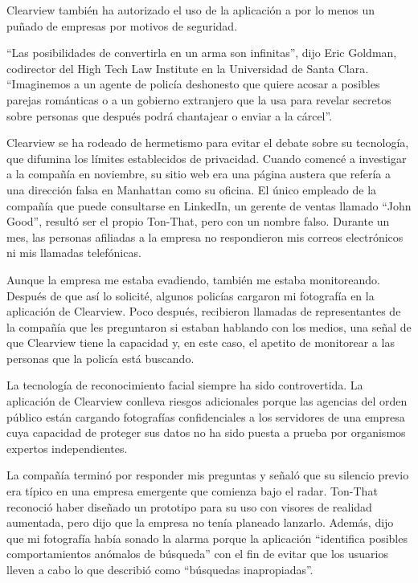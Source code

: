 Clearview también ha autorizado el uso de la aplicación a por lo menos
un puñado de empresas por motivos de seguridad.

``Las posibilidades de convertirla en un arma son infinitas'', dijo Eric
Goldman, codirector del High Tech Law Institute en la Universidad de
Santa Clara. ``Imaginemos a un agente de policía deshonesto que quiere
acosar a posibles parejas románticas o a un gobierno extranjero que la
usa para revelar secretos sobre personas que después podrá chantajear o
enviar a la cárcel''.

Clearview se ha rodeado de hermetismo para evitar el debate sobre su
tecnología, que difumina los límites establecidos de privacidad. Cuando
comencé a investigar a la compañía en noviembre, su sitio web era una
página austera que refería a una dirección falsa en Manhattan como su
oficina. El único empleado de la compañía que puede consultarse en
LinkedIn, un gerente de ventas llamado ``John Good'', resultó ser el
propio Ton-That, pero con un nombre falso. Durante un mes, las personas
afiliadas a la empresa no respondieron mis correos electrónicos ni mis
llamadas telefónicas.

Aunque la empresa me estaba evadiendo, también me estaba monitoreando.
Después de que así lo solicité, algunos policías cargaron mi fotografía
en la aplicación de Clearview. Poco después, recibieron llamadas de
representantes de la compañía que les preguntaron si estaban hablando
con los medios, una señal de que Clearview tiene la capacidad y, en este
caso, el apetito de monitorear a las personas que la policía está
buscando.

La tecnología de reconocimiento facial siempre ha sido controvertida. La
aplicación de Clearview conlleva riesgos adicionales porque las agencias
del orden público están cargando fotografías confidenciales a los
servidores de una empresa cuya capacidad de proteger sus datos no ha
sido puesta a prueba por organismos expertos independientes.

La compañía terminó por responder mis preguntas y señaló que su silencio
previo era típico en una empresa emergente que comienza bajo el radar.
Ton-That reconoció haber diseñado un prototipo para su uso con visores
de realidad aumentada, pero dijo que la empresa no tenía planeado
lanzarlo. Además, dijo que mi fotografía había sonado la alarma porque
la aplicación ``identifica posibles comportamientos anómalos de
búsqueda'' con el fin de evitar que los usuarios lleven a cabo lo que
describió como ``búsquedas inapropiadas''.


